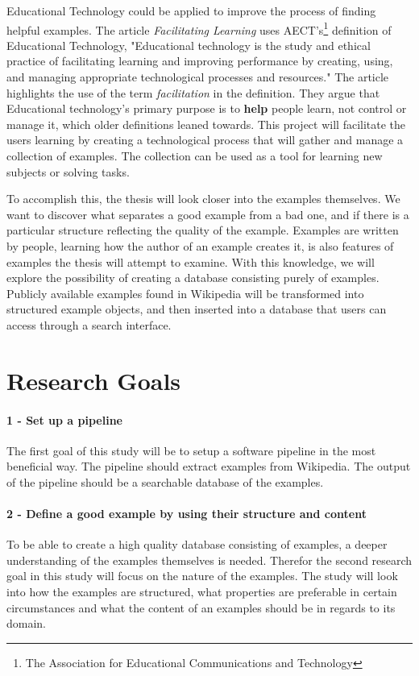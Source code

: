 Educational Technology could be applied to improve the process of finding helpful examples. The article \textit{Facilitating Learning} \cite{e-learning} uses AECT's\footnote{The Association for Educational Communications and Technology} definition of Educational Technology, "Educational technology is the study and ethical practice of facilitating learning and improving performance by creating, using, and managing appropriate technological processes and resources." The article highlights the use of the term \textit{facilitation} in the definition. They argue that Educational technology's primary purpose is to \textbf{help} people learn, not control or manage it, which older definitions leaned towards. This project will facilitate the users learning by creating a technological process that will gather and manage a collection of examples. The collection can be used as a tool for learning new subjects or solving tasks.

To accomplish this, the thesis will look closer into the examples themselves. We want to discover what separates a good example from a bad one, and if there is a particular structure reflecting the quality of the example. Examples are written by people, learning how the author of an example creates it, is also features of examples the thesis will attempt to examine. With this knowledge, we will explore the possibility of creating a database consisting purely of examples. Publicly available examples found in Wikipedia will be transformed into structured example objects, and then inserted into a database that users can access through a search interface. 



\section{Research Goals}


\paragraph{1 - Set up a pipeline}
The first goal of this study will be to setup a software pipeline in the most beneficial way. The pipeline should extract examples from Wikipedia. The output of the pipeline should be a searchable database of the examples.

\paragraph{2 - Define a good example by using their structure and content}
To be able to create a high quality database consisting of examples, a deeper understanding of the examples themselves is needed. Therefor the second research goal in this study will focus on the nature of the examples. The study will look into how the examples are structured, what properties are preferable in certain circumstances and what the content of an examples should be in regards to its domain. 

